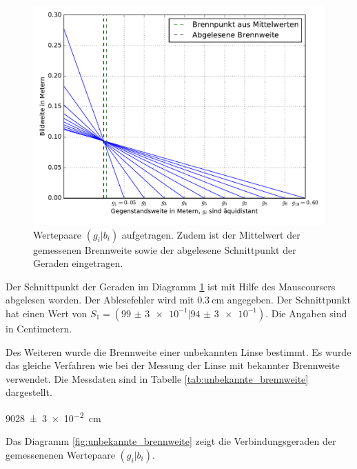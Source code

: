 \begin{figure}
  \centering
  \includegraphics[width=\textwidth]{Pics/Messung1_brennnweite_bekannt.pdf}
  \caption{Wertepaare $(g_i|b_i)$ aufgetragen. Zudem ist der Mittelwert der gemessenen Brennweite sowie der abgelesene Schnittpunkt der Geraden eingetragen.}
  \label{fig:brennweite_bekannt}
\end{figure}

Der Schnittpunkt der Geraden im Diagramm \ref{fig:brennweite_bekannt}
ist mit Hilfe des Mauscoursers abgelesen worden. Der Ablesefehler wird mit
$\SI{0,3}{\centi\meter}$ angegeben.
Der Schnittpunkt hat einen Wert von $S_1 = (\num{99(3)e-1}|\num{94(3)e-1})$.
Die Angaben sind in Centimetern.

Des Weiteren wurde die Brennweite einer unbekannten Linse bestimmt.
Es wurde das gleiche Verfahren wie bei der Messung der Linse mit bekannter
Brennweite verwendet.
Die Messdaten sind in Tabelle \ref{tab:unbekannte_brennweite} dargestellt.

\begin{description}
  \centering
  \item[$<f_2>\ua{gemessen}=$]\SI{9028(3)e-2}{\centi\meter}
\end{description}

Das Diagramm \ref{fig:unbekannte_brennweite} zeigt die Verbindungsgeraden
der gemessenenen Wertepaare  $(g_i|b_i)$.

